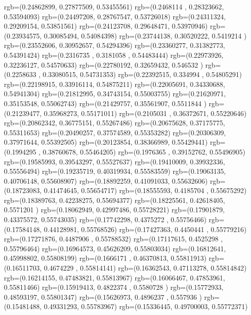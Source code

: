 {{{		  rgb=(0.24862899,  0.27877509,  0.53455561)
		  rgb=(0.2468114 ,  0.28323662,  0.53594093)
		  rgb=(0.24497208,  0.28767547,  0.53726018)
		  rgb=(0.24311324,  0.29209154,  0.53851561)
		  rgb=(0.24123708,  0.29648471,  0.53970946)
		  rgb=(0.23934575,  0.30085494,  0.54084398)
		  rgb=(0.23744138,  0.30520222,  0.5419214 )
		  rgb=(0.23552606,  0.30952657,  0.54294396)
		  rgb=(0.23360277,  0.31382773,  0.54391424)
		  rgb=(0.2316735 ,  0.3181058 ,  0.54483444)
		  rgb=(0.22973926,  0.32236127,  0.54570633)
		  rgb=(0.22780192,  0.32659432,  0.546532  )
		  rgb=(0.2258633 ,  0.33080515,  0.54731353)
		  rgb=(0.22392515,  0.334994  ,  0.54805291)
		  rgb=(0.22198915,  0.33916114,  0.54875211)
		  rgb=(0.22005691,  0.34330688,  0.54941304)
		  rgb=(0.21812995,  0.34743154,  0.55003755)
		  rgb=(0.21620971,  0.35153548,  0.55062743)
		  rgb=(0.21429757,  0.35561907,  0.5511844 )
		  rgb=(0.21239477,  0.35968273,  0.55171011)
		  rgb=(0.2105031 ,  0.36372671,  0.55220646)
		  rgb=(0.20862342,  0.36775151,  0.55267486)
		  rgb=(0.20675628,  0.37175775,  0.55311653)
		  rgb=(0.20490257,  0.37574589,  0.55353282)
		  rgb=(0.20306309,  0.37971644,  0.55392505)
		  rgb=(0.20123854,  0.38366989,  0.55429441)
		  rgb=(0.1994295 ,  0.38760678,  0.55464205)
		  rgb=(0.1976365 ,  0.39152762,  0.55496905)
		  rgb=(0.19585993,  0.39543297,  0.55527637)
		  rgb=(0.19410009,  0.39932336,  0.55556494)
		  rgb=(0.19235719,  0.40319934,  0.55583559)
		  rgb=(0.19063135,  0.40706148,  0.55608907)
		  rgb=(0.18892259,  0.41091033,  0.55632606)
		  rgb=(0.18723083,  0.41474645,  0.55654717)
		  rgb=(0.18555593,  0.4185704 ,  0.55675292)
		  rgb=(0.18389763,  0.42238275,  0.55694377)
		  rgb=(0.18225561,  0.42618405,  0.5571201 )
		  rgb=(0.18062949,  0.42997486,  0.55728221)
		  rgb=(0.17901879,  0.43375572,  0.55743035)
		  rgb=(0.17742298,  0.4375272 ,  0.55756466)
		  rgb=(0.17584148,  0.44128981,  0.55768526)
		  rgb=(0.17427363,  0.4450441 ,  0.55779216)
		  rgb=(0.17271876,  0.4487906 ,  0.55788532)
		  rgb=(0.17117615,  0.4525298 ,  0.55796464)
		  rgb=(0.16964573,  0.45626209,  0.55803034)
		  rgb=(0.16812641,  0.45998802,  0.55808199)
		  rgb=(0.1666171 ,  0.46370813,  0.55811913)
		  rgb=(0.16511703,  0.4674229 ,  0.55814141)
		  rgb=(0.16362543,  0.47113278,  0.55814842)
		  rgb=(0.16214155,  0.47483821,  0.55813967)
		  rgb=(0.16066467,  0.47853961,  0.55811466)
		  rgb=(0.15919413,  0.4822374 ,  0.5580728 )
		  rgb=(0.15772933,  0.48593197,  0.55801347)
		  rgb=(0.15626973,  0.4896237 ,  0.557936  )
		  rgb=(0.15481488,  0.49331293,  0.55783967)
		  rgb=(0.15336445,  0.49700003,  0.55772371)
}}}
